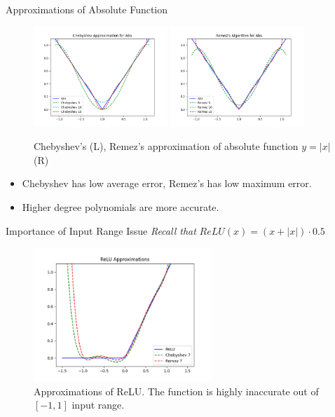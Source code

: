 \documentclass[9pt]{beamer}
\begin{document}
\begin{frame}{Approximations of Absolute Function}
    \begin{figure}[!h]
        \centering
        \includegraphics[width=0.45\textwidth]{resource/chebyshev.png}
        \includegraphics[width=0.45\textwidth]{resource/remez.png}
        \caption{Chebyshev's (L), Remez's approximation of absolute function $y = |x|$ (R)}
        \label{fig:approximates_absolute}
    \end{figure}
    \begin{itemize}
        \item Chebyshev has low average error, Remez's has low maximum error.
        \item Higher degree polynomials are more accurate.
    \end{itemize}
\end{frame}

\begin{frame}{Importance of Input Range Issue}
    \textit{Recall that} $ReLU(x) = (x + |x|) \cdot 0.5$
    \begin{figure}[!h]
        \centering
        \includegraphics[width=0.6\textwidth]{resource/relu.png}
        \caption{Approximations of ReLU. The function is \alert{highly inaccurate out of $[-1, 1]$ input range.}}
        \label{fig:approximates_relu}
    \end{figure}
\end{frame}
\end{document}
